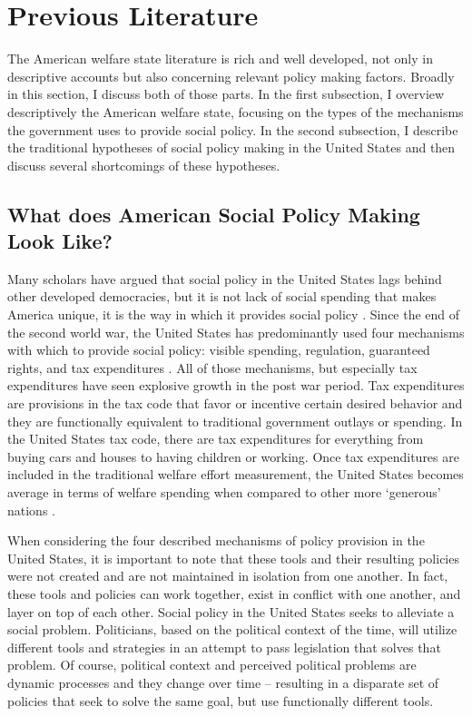 \documentclass[12pt]{article}
\begin{document}
\section{Previous Literature}

The American welfare state literature is rich and well developed, not only in descriptive accounts but also concerning relevant policy making factors. Broadly in this section, I discuss both of those parts. In the first subsection, I overview descriptively the American welfare state, focusing on the types of the mechanisms the government uses to provide social policy. In the second subsection, I describe the traditional hypotheses of social policy making in the United States and then discuss several shortcomings of these hypotheses. 

\subsection{What does American Social Policy Making Look Like?}
Many scholars have argued that social policy in the United States lags behind other developed democracies, but it is not lack of social spending that makes America unique, it is the way in which it provides social policy \citep{hacker2002}. Since the end of the second world war, the United States has predominantly used four mechanisms with which to provide social policy: visible spending, regulation, guaranteed rights, and tax expenditures \citep{pierson2007}. All of those mechanisms, but especially tax expenditures have seen explosive growth in the post war period. Tax expenditures are provisions in the tax code that favor or incentive certain desired behavior and they are functionally equivalent to traditional government outlays or spending. In the United States tax code, there are tax expenditures for everything from buying cars and houses to having children or working. Once tax expenditures are included in the traditional welfare effort measurement, the United States becomes average in terms of welfare spending when compared to other more `generous' nations \citep[Ch. 1]{howard2008}.

When considering the four described mechanisms of policy provision in the United States, it is important to note that these tools and their resulting policies were not created and are not maintained in isolation from one another. In fact, these tools and policies can work together, exist in conflict with one another, and layer on top of each other. Social policy in the United States seeks to alleviate a social problem. Politicians, based on the political context of the time, will utilize different tools and strategies in an attempt to pass legislation that solves that problem. Of course, political context and perceived political problems are dynamic processes and they change over time -- resulting in a disparate set of policies that seek to solve the same goal, but use functionally different tools.
\end{document}
